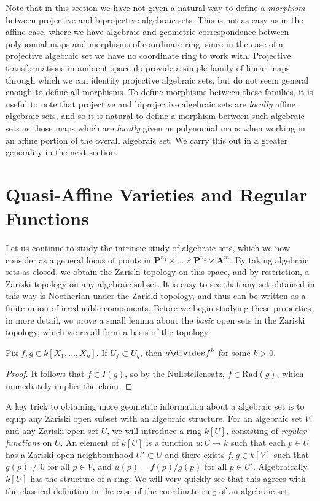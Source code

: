 Note that in this section we have not given a natural way to define a \emph{morphism} between projective and biprojective algebraic sets. This is not as easy as in the affine case, where we have algebraic and geometric correspondence between polynomial maps and morphisms of coordinate ring, since in the case of a projective algebraic set we have no coordinate ring to work with. Projective transformations in ambient space do provide a simple family of linear maps through which we can identify projective algebraic sets, but do not seem general enough to define all morphisms. To define morphisms between these families, it is useful to note that projective and biprojective algebraic sets are \emph{locally} affine algebraic sets, and so it is natural to define a morphism between such algebraic sets as those maps which are \emph{locally} given as polynomial maps when working in an affine portion of the overall algebraic set. We carry this out in a greater generality in the next section.

\section{Quasi-Affine Varieties and Regular Functions}

Let us continue to study the intrinsic study of algebraic sets, which we now consider as a general locus of points in $\mathbf{P}^{n_1} \times \dots \times \mathbf{P}^{n_k} \times \mathbf{A}^m$. By taking algebraic sets as closed, we obtain the Zariski topology on this space, and by restriction, a Zariski topology on any algebraic subset. It is easy to see that any set obtained in this way is Noetherian under the Zariski topology, and thus can be written as a finite union of irreducible components. Before we begin studying these properties in more detail, we prove a small lemma about the \emph{basic} open sets in the Zariski topology, which we recall form a basis of the topology.

\begin{lemma}
    Fix $f,g \in k[X_1,\dots,X_n]$. If $U_f \subset U_g$, then $g \divides f^k$ for some $k > 0$.
\end{lemma}
\begin{proof}
    It follows that $f \in I(g)$, so by the Nullstellensatz, $f \in \text{Rad}(g)$, which immediately implies the claim.
\end{proof}

A key trick to obtaining more geometric information about a algebraic set is to equip any Zariski open subset with an algebraic structure. For an algebraic set $V$, and any Zariski open set $U$, we will introduce a ring $k[U]$, consisting of \emph{regular functions} on $U$. An element of $k[U]$ is a function $u: U \to k$ such that each $p \in U$ has a Zariski open neighbourhood $U' \subset U$ and there exists $f,g \in k[V]$ such that $g(p) \neq 0$ for all $p \in V$, and $u(p) = f(p)/g(p)$ for all $p \in U'$. Algebraically, $k[U]$ has the structure of a ring. We will very quickly see that this agrees with the classical definition in the case of the coordinate ring of an algebraic set.


